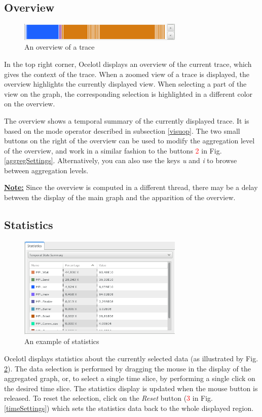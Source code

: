 \documentclass[twoside]{article}
\begin{document}
\begin{sloppypar}
\subsection{Overview}
\begin{figure}[h!]
	\centering
	\includegraphics[width=0.7\textwidth]{images/overview.png}
	\caption{An overview of a trace}
	\label{overview}
\end{figure}
In the top right corner, Ocelotl displays an overview of the current trace, which gives the context of the trace. When a zoomed view of a trace is displayed, the overview highlights the currently displayed view. When selecting a part of the view on the graph, the corresponding selection is highlighted in a different color on the overview.

The overview shows a temporal summary of the currently displayed trace. It is based on the mode operator described in subsection \ref{visuop}. The two small buttons on the right of the overview can be used to modify the aggregation level of the overview, and work in a similar fashion to the buttons \textcolor{red}{2} in Fig. \ref{aggregSettings}. Alternatively, you can also use the keys \textit{u} and \textit{i} to browse between aggregation levels.

\underline{\textbf{Note:}} Since the overview is computed in a different thread, there may be a delay between the display of the main graph and the apparition of the overview.

\subsection{Statistics}
\begin{figure}[h!]
	\centering
	\includegraphics[width=0.7\textwidth]{images/statistics.png}
	\caption{An example of statistics}
	\label{stats}
\end{figure}
Ocelotl displays statistics about the currently selected data (as illustrated by Fig. \ref{stats}). The data selection is performed by dragging the mouse in the display of the aggregated graph, or, to select a single time slice, by performing a single click on the desired time slice. The statistics display is updated when the mouse button is released. To reset the selection, click on the \textit{Reset} button (\textcolor{red}{3} in Fig. \ref{timeSettings}) which sets the statistics data back to the whole displayed region. 


\end{sloppypar}
\end{document}
